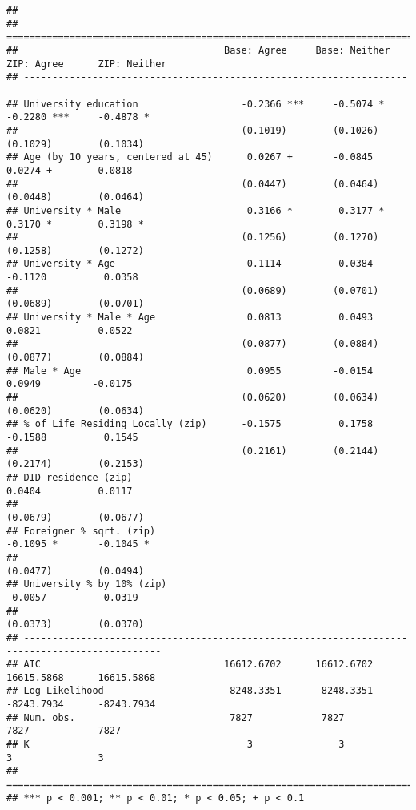 \documentclass[
]{article}
\begin{document}
\begin{verbatim}
## 
## ==============================================================================================
##                                    Base: Agree     Base: Neither  ZIP: Agree      ZIP: Neither
## ----------------------------------------------------------------------------------------------
## University education                  -0.2366 ***     -0.5074 *      -0.2280 ***     -0.4878 *
##                                       (0.1019)        (0.1026)       (0.1029)        (0.1034) 
## Age (by 10 years, centered at 45)      0.0267 +       -0.0845         0.0274 +       -0.0818  
##                                       (0.0447)        (0.0464)       (0.0448)        (0.0464) 
## University * Male                      0.3166 *        0.3177 *       0.3170 *        0.3198 *
##                                       (0.1256)        (0.1270)       (0.1258)        (0.1272) 
## University * Age                      -0.1114          0.0384        -0.1120          0.0358  
##                                       (0.0689)        (0.0701)       (0.0689)        (0.0701) 
## University * Male * Age                0.0813          0.0493         0.0821          0.0522  
##                                       (0.0877)        (0.0884)       (0.0877)        (0.0884) 
## Male * Age                             0.0955         -0.0154         0.0949         -0.0175  
##                                       (0.0620)        (0.0634)       (0.0620)        (0.0634) 
## % of Life Residing Locally (zip)      -0.1575          0.1758        -0.1588          0.1545  
##                                       (0.2161)        (0.2144)       (0.2174)        (0.2153) 
## DID residence (zip)                                                   0.0404          0.0117  
##                                                                      (0.0679)        (0.0677) 
## Foreigner % sqrt. (zip)                                              -0.1095 *       -0.1045 *
##                                                                      (0.0477)        (0.0494) 
## University % by 10% (zip)                                            -0.0057         -0.0319  
##                                                                      (0.0373)        (0.0370) 
## ----------------------------------------------------------------------------------------------
## AIC                                16612.6702      16612.6702     16615.5868      16615.5868  
## Log Likelihood                     -8248.3351      -8248.3351     -8243.7934      -8243.7934  
## Num. obs.                           7827            7827           7827            7827       
## K                                      3               3              3               3       
## ==============================================================================================
## *** p < 0.001; ** p < 0.01; * p < 0.05; + p < 0.1
\end{verbatim}
\end{document}

